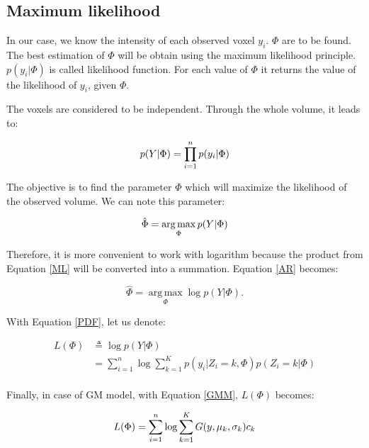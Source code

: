 \subsection{Maximum likelihood}
In our case, we know the intensity of each observed voxel $y_i$. $\Phi$ are to be found. The best estimation of $\Phi$ will be obtain using the maximum likelihood principle. $p(y_i|\Phi)$ is called likelihood function. For each value of $\Phi$ it returns the value of the likelihood of $y_i$, given $\Phi$.
\par
The voxels are considered to be independent. Through the whole volume, it leads to:
 
  \begin{equation}\label{ML}
  p(Y|\Phi)= \prod_{i=1}^n p(y_i|\Phi)\\
  \end{equation}

\par
The objective is to find the parameter $\Phi$ which will maximize the likelihood of the observed volume. We can note this parameter:
  
  \begin{equation}\label{AR}
  \hat{\Phi}=\operatorname*{arg\,max}_\Phi p(Y|\Phi)\\
  \end{equation}

\par
Therefore, it is more convenient to work with logarithm because the product from Equation \ref{ML} will be converted into a summation. Equation \ref{AR} becomes:
  
  \begin{equation*}\label{ARL}
  \hat{\Phi}=\operatorname*{arg\,max}_\Phi \operatorname*{log} p(Y|\Phi). %
  \end{equation*}
  
With Equation \ref{PDF}, let us denote:

  \begin{align*}
  L(\Phi) &\triangleq \operatorname*{log} p(Y|\Phi) \\
          &= \sum_{i=1}^n \operatorname*{log} \sum_{k=1}^K p(y_i|Z_i=k,\Phi)p(Z_i=k|\Phi)\\
  \end{align*} 

Finally, in case of GM model, with Equation \ref{GMM}, $L(\Phi)$ becomes:
  
  \begin{equation*}\label{LP}
  L(\Phi)=\sum_{i=1}^n \operatorname*{log} \sum_{k=1}^K G(y,\mu_k,\sigma_k)c_k\\
  \end{equation*}

